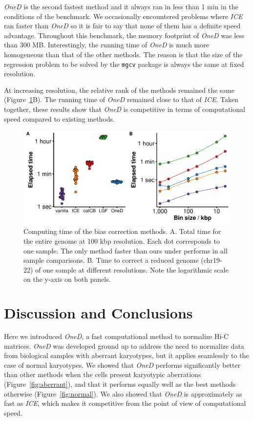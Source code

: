 \documentclass{bioinfo}
\begin{document}
\textit{OneD} is the second fastest method and it always ran in less than
1 min in the conditions of the benchmark. We occasionally encountered
problems where \textit{ICE} ran faster than \textit{OneD} so it is fair to
say that none of them has a definite speed advantage. Throughout this
benchmark, the memory footprint of \textit{OneD} was less than 300 MB.
Interestingly, the running time of \textit{OneD} is much more homogeneous
than that of the other methods. The reason is that the size of the
regression problem to be solved by the \texttt{mgcv} package is always the
same at fixed resolution.

At increasing resolution, the relative rank of the methods remained the
same (Figure~\ref{fig:times}B). The running time of \textit{OneD} remained
close to that of \textit{ICE}. Taken together, these results show that
\textit{OneD} is competitive in terms of computational speed compared to
existing methods.

\begin{figure}
\centerline{\includegraphics[width=.5\textwidth]
  {img/figure_benchmark_time.pdf}}
\caption{
Computing time of the bias correction methods. A. Total time for the
entire genome at 100 kbp resolution. Each dot corresponds to one sample.
The only method faster than ours under performs in all sample comparisons.
B. Time to correct a reduced genome (chr19-22) of one sample at different
resolutions. Note the logarithmic scale on the y-axis on both panels.}
\label{fig:times}
\end{figure}






\section{Discussion and Conclusions}

Here we introduced \textit{OneD}, a fast computational method to normalize
Hi-C matrices. \textit{OneD} was developed ground up to address the need
to normalize data from biological samples with aberrant karyotypes, but it
applies seamlessly to the case of normal karyotypes. We showed that
\textit{OneD} performs significantly better than other methods when the
cells present karyotypic aberrations (Figure~\ref{fig:aberrant}), and that
it performs equally well as the best methods otherwise
(Figure~\ref{fig:normal}). We also showed that \textit{OneD} is
approximately as fast as \textit{ICE}, which makes it competitive from the
point of view of computational speed.
\end{document}
